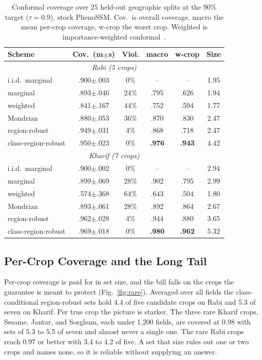 \documentclass[conference]{IEEEtran}
\begin{document}
\begin{table}[t]\centering\caption{Conformal coverage over 25 held-out geographic
splits at the 90\% target ($\tau{=}0.9$), stock PhenoSSM. Cov.\ is overall coverage,
macro the mean per-crop coverage, w-crop the worst crop. Weighted is
importance-weighted conformal~\cite{tibshirani2019covshift}.}\label{tab:conf}
\footnotesize
\setlength{\tabcolsep}{3.5pt}
\begin{tabular}{lccccc}
\toprule
Scheme & Cov.\ (m$\pm$s) & Viol. & macro & w-crop & Size\\
\midrule
\multicolumn{6}{c}{\textit{Rabi (5 crops)}}\\
i.i.d.\ marginal      & .900$\pm$.003 & 0\%  & --   & --   & 1.95\\
marginal              & .893$\pm$.046 & 24\% & .795 & .626 & 1.94\\
weighted              & .841$\pm$.167 & 44\% & .752 & .594 & 1.77\\
Mondrian              & .880$\pm$.053 & 36\% & .870 & .830 & 2.47\\
region-robust         & .949$\pm$.031 & 4\%  & .868 & .718 & 2.47\\
class-region-robust   & .950$\pm$.023 & 0\%  & \textbf{.976} & \textbf{.943} & 4.42\\
\midrule
\multicolumn{6}{c}{\textit{Kharif (7 crops)}}\\
i.i.d.\ marginal      & .900$\pm$.002 & 0\%  & --   & --   & 2.94\\
marginal              & .899$\pm$.069 & 28\% & .902 & .795 & 2.99\\
weighted              & .574$\pm$.368 & 64\% & .643 & .504 & 1.80\\
Mondrian              & .893$\pm$.061 & 28\% & .892 & .864 & 2.67\\
region-robust         & .962$\pm$.028 & 4\%  & .944 & .880 & 3.65\\
class-region-robust   & .969$\pm$.018 & 0\%  & \textbf{.980} & \textbf{.962} & 5.32\\
\bottomrule
\end{tabular}\end{table}

\subsection{Per-Crop Coverage and the Long Tail}\label{ssec:rare}
Per-crop coverage is paid for in set size, and the bill falls on the crops the
guarantee is meant to protect (Fig.~\ref{fig:rare}). Averaged over all fields the
class-conditional region-robust sets hold 4.4 of five candidate crops on Rabi and 5.3
of seven on Kharif. Per true crop the picture is starker. The three rare Kharif crops,
Sesame, Jantar, and Sorghum, each under 1{,}200 fields, are covered at 0.98 with sets
of 5.3 to 5.5 of seven and almost never a single one. The rare Rabi crops reach 0.97
or better with 3.4 to 4.2 of five. A set that size rules out one or two crops and
names none, so it is reliable without supplying an answer.
\end{document}
